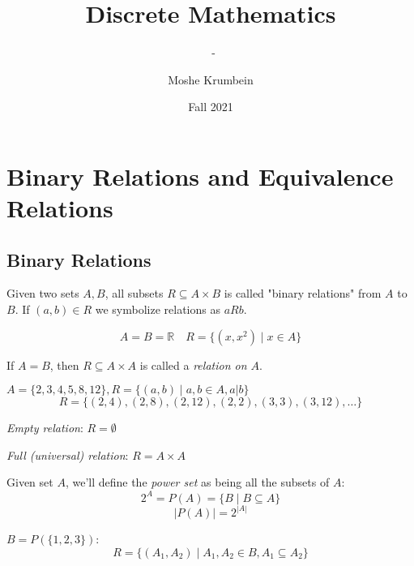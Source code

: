 \documentclass[00_complete]{subfiles}
\title{Discrete Mathematics}
\author{Moshe Krumbein}
\date{Fall 2021}
\begin{document}
\setcounter{chapter}{2}

\chapter{Binary Relations and Equivalence Relations}
\subtitle{\theauthor~- \thedate}

\section{Binary Relations}
\begin{definition}
Given two sets $A, B$, all subsets $R \subseteq A \times B$ is called "binary
relations" from $A$ to $B$. If $(a,b) \in R$ we symbolize relations as $aRb$.
\end{definition}

\begin{example}
$$A=B=\mathbb{R} \quad R=\{(x,x^2) \mid x \in A \}$$
\end{example}

\begin{definition}
If $A=B$, then $R \subseteq A \times A$ is called a \emph{relation on $A$}.
\end{definition}

\begin{example}
$A=\{2,3,4,5,8,12\}, R=\{(a,b) \mid a, b \in A, a | b \}$
$$R=\{(2,4), (2,8),(2,12),(2,2),(3,3),(3,12),\ldots \}$$
\end{example}

\begin{definition}
\emph{Empty relation}: $R=\emptyset$
\end{definition}
\begin{definition}
\emph{Full (universal) relation}: $R = A \times A$
\end{definition}
\begin{definition}
Given set $A$, we'll define the \emph{power set} as being all the subsets of $A$:
$$2^A = P(A) = \{B \mid B \subseteq A \}$$
$$|P(A)| = 2^{|A|}$$
\end{definition}
\begin{example}
$B = P(\{1,2,3\})$:
$$R=\{(A_1,A_2) \mid A_1, A_2 \in B, A_1 \subseteq A_2 \}$$
\end{example}
\end{document}
